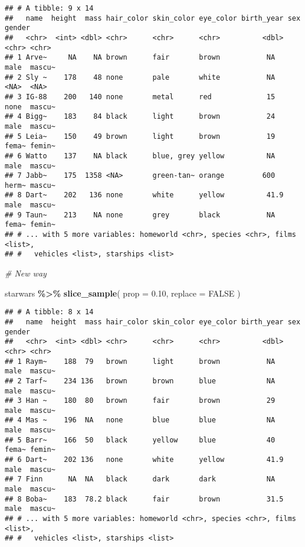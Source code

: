 \documentclass[
]{book}
\newenvironment{Shaded}{\begin{snugshade}}{\end{snugshade}}
\newcommand{\CommentTok}[1]{\textcolor[rgb]{0.56,0.35,0.01}{\textit{#1}}}
\newcommand{\DataTypeTok}[1]{\textcolor[rgb]{0.13,0.29,0.53}{#1}}
\newcommand{\FloatTok}[1]{\textcolor[rgb]{0.00,0.00,0.81}{#1}}
\newcommand{\KeywordTok}[1]{\textcolor[rgb]{0.13,0.29,0.53}{\textbf{#1}}}
\newcommand{\NormalTok}[1]{#1}
\newcommand{\OperatorTok}[1]{\textcolor[rgb]{0.81,0.36,0.00}{\textbf{#1}}}
\newcommand{\OtherTok}[1]{\textcolor[rgb]{0.56,0.35,0.01}{#1}}
\newcommand{\StringTok}[1]{\textcolor[rgb]{0.31,0.60,0.02}{#1}}
\begin{document}
\begin{verbatim}
## # A tibble: 9 x 14
##   name  height  mass hair_color skin_color eye_color birth_year sex   gender
##   <chr>  <int> <dbl> <chr>      <chr>      <chr>          <dbl> <chr> <chr> 
## 1 Arve~     NA    NA brown      fair       brown           NA   male  mascu~
## 2 Sly ~    178    48 none       pale       white           NA   <NA>  <NA>  
## 3 IG-88    200   140 none       metal      red             15   none  mascu~
## 4 Bigg~    183    84 black      light      brown           24   male  mascu~
## 5 Leia~    150    49 brown      light      brown           19   fema~ femin~
## 6 Watto    137    NA black      blue, grey yellow          NA   male  mascu~
## 7 Jabb~    175  1358 <NA>       green-tan~ orange         600   herm~ mascu~
## 8 Dart~    202   136 none       white      yellow          41.9 male  mascu~
## 9 Taun~    213    NA none       grey       black           NA   fema~ femin~
## # ... with 5 more variables: homeworld <chr>, species <chr>, films <list>,
## #   vehicles <list>, starships <list>
\end{verbatim}

\begin{Shaded}
\begin{Highlighting}[]
\CommentTok{\# New way}

\NormalTok{starwars }\OperatorTok{\%\textgreater{}\%}
\StringTok{  }\KeywordTok{slice\_sample}\NormalTok{(}
    \DataTypeTok{prop =} \FloatTok{0.10}\NormalTok{,}
    \DataTypeTok{replace =} \OtherTok{FALSE}
\NormalTok{  )}
\end{Highlighting}
\end{Shaded}

\begin{verbatim}
## # A tibble: 8 x 14
##   name  height  mass hair_color skin_color eye_color birth_year sex   gender
##   <chr>  <int> <dbl> <chr>      <chr>      <chr>          <dbl> <chr> <chr> 
## 1 Raym~    188  79   brown      light      brown           NA   male  mascu~
## 2 Tarf~    234 136   brown      brown      blue            NA   male  mascu~
## 3 Han ~    180  80   brown      fair       brown           29   male  mascu~
## 4 Mas ~    196  NA   none       blue       blue            NA   male  mascu~
## 5 Barr~    166  50   black      yellow     blue            40   fema~ femin~
## 6 Dart~    202 136   none       white      yellow          41.9 male  mascu~
## 7 Finn      NA  NA   black      dark       dark            NA   male  mascu~
## 8 Boba~    183  78.2 black      fair       brown           31.5 male  mascu~
## # ... with 5 more variables: homeworld <chr>, species <chr>, films <list>,
## #   vehicles <list>, starships <list>
\end{verbatim}
\end{document}
